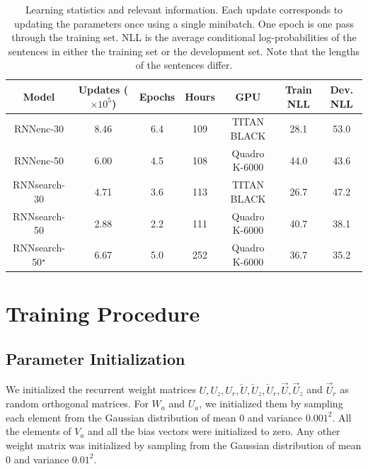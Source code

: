 \documentclass{article} %
\newcommand{\ola}{\overleftarrow}
\newcommand{\ora}{\overrightarrow}
\begin{document}
\begin{table}[t]
    \centering                                                                                         
    \begin{tabular}{c|cccccc}                                                                           
        Model & Updates {\scriptsize ($\times 10^5$)} & Epochs 
        & Hours & GPU & Train NLL & Dev. NLL \\
        \hline                                                           
        \hline
        RNNenc-30 & 8.46 & 6.4 & 109 & {\small TITAN BLACK} & 28.1 & 53.0 \\                                                
        RNNenc-50 & 6.00 & 4.5 & 108 & {\small Quadro K-6000} & 44.0 & 43.6 \\
        \hline
        RNNsearch-30 & 4.71 & 3.6 & 113 & {\small TITAN BLACK} & 26.7 & 47.2 \\
        RNNsearch-50 & 2.88 & 2.2 & 111 & {\small Quadro K-6000} & 40.7 & 38.1 \\
        \hline
    RNNsearch-50$^\star$ & 6.67 & 5.0 & 252 & {\small Quadro K-6000} & 36.7 & 35.2 \\
    \end{tabular}                                                                                      
    \caption{Learning statistics and relevant information. Each update
        corresponds to updating the parameters once using a single minibatch. 
        One epoch is one pass through the training set.
        NLL is the average conditional log-probabilities of the
        sentences in either the training set or the development set. Note that
    the lengths of the sentences differ.}
    \label{tbl:stat}                                                                                   
\end{table}                                                                                            


\section{Training Procedure}
\label{sec:training_detail}

\subsection{Parameter Initialization}

We initialized the recurrent weight matrices $U, U_z, U_r, \ola{U}, \ola{U}_z,
\ola{U}_r, \ora{U}, \ora{U}_z$ and $\ora{U}_r$ as random orthogonal matrices.
For $W_a$ and $U_a$, we initialized them by sampling each element from the
Gaussian distribution of mean $0$ and variance $0.001^2$. All the elements of
$V_a$ and all the bias vectors were initialized to zero. Any other weight matrix
was initialized by sampling from the Gaussian distribution of mean $0$ and
variance $0.01^2$.
\end{document}
